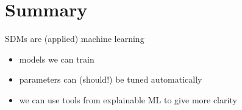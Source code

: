 \documentclass[12pt, smalloffset, compress, aspectratio=1610]{beamer}
\providecommand{\tightlist}{%
  \setlength{\itemsep}{0pt}\setlength{\parskip}{0pt}}
\begin{document}
\section{Summary}\label{summary}

\begin{frame}{SDMs are (applied) machine learning}
\label{sdms-are-applied-machine-learning}
\begin{itemize}
\tightlist
\item
  models we can train
\item
  parameters can (should!) be tuned automatically
\item
  we can use tools from explainable ML to give more clarity
\end{itemize}
\end{frame}
\end{document}
